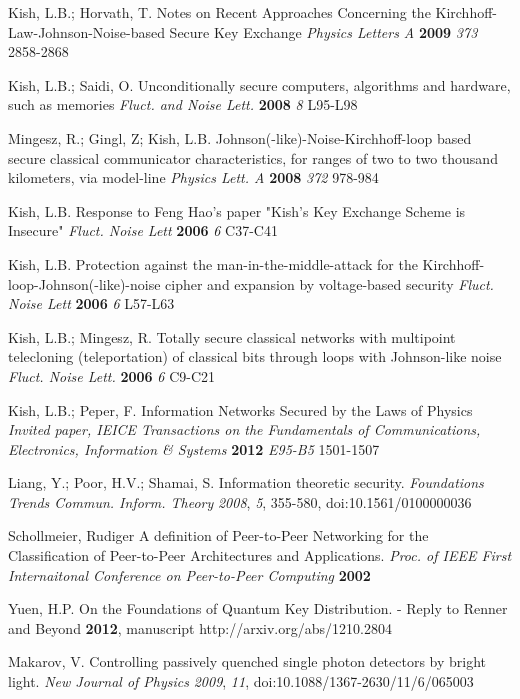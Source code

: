 \documentclass[a4paper,12pt,pdftex]{article}
\begin{document}
\begin{thebibliography}{99}
Kish, L.B.; Horvath, T. Notes on Recent Approaches Concerning the Kirchhoff-Law-Johnson-Noise-based Secure Key Exchange {\em Physics Letters A} {\bf 2009} {\em 373} 2858-2868

Kish, L.B.; Saidi, O. Unconditionally secure computers, algorithms and hardware, such as memories {\em Fluct. and Noise Lett.} {\bf 2008} {\em 8 } L95-L98 

Mingesz, R.; Gingl, Z; Kish, L.B. Johnson(-like)-Noise-Kirchhoff-loop based secure classical communicator characteristics, for ranges of two to two thousand kilometers, via model-line {\em Physics Lett. A} {\bf 2008} {\em 372} 978-984

Kish, L.B. Response to Feng Hao's paper "Kish's Key Exchange Scheme is Insecure" {\em Fluct. Noise Lett} {\bf 2006} {\em 6} C37-C41

Kish, L.B. Protection against the man-in-the-middle-attack for the Kirchhoff-loop-Johnson(-like)-noise cipher and expansion by voltage-based security {\em Fluct. Noise Lett} {\bf 2006} {\em 6} L57-L63

Kish, L.B.; Mingesz, R. Totally secure classical networks with multipoint telecloning (teleportation) of classical bits through loops with Johnson-like noise {\em Fluct. Noise Lett.} {\bf 2006} {\em 6} C9-C21

Kish, L.B.; Peper, F. Information Networks Secured by the Laws of Physics {\em Invited paper, IEICE Transactions on the Fundamentals of Communications, Electronics, Information \& Systems} {\bf 2012} {\em E95-B5} 1501-1507


Liang, Y.; Poor, H.V.; Shamai, S. Information theoretic security. {\em Foundations Trends Commun. Inform. Theory} {\em 2008}, {\em 5}, 355-580, doi:10.1561/0100000036

Schollmeier, Rudiger A definition of Peer-to-Peer Networking for the Classification of Peer-to-Peer Architectures and Applications. {\em Proc. of IEEE First Internaitonal Conference on Peer-to-Peer Computing} {\bf 2002} 

Yuen, H.P. On the Foundations of Quantum Key Distribution. - Reply to Renner and Beyond {\bf 2012}, manuscript http://arxiv.org/abs/1210.2804

Makarov, V. Controlling passively quenched single photon detectors by bright light. {\em New Journal of Physics} {\em 2009}, {\em 11}, doi:10.1088/1367-2630/11/6/065003


\end{thebibliography}
\end{document}
